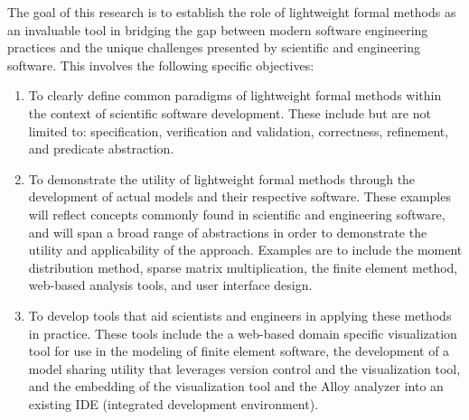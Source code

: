 \documentclass[../../proposal.tex]{subfiles}
\begin{document}
The goal of this research is to establish the role of lightweight formal methods as an invaluable tool in bridging the gap between modern software engineering practices and the unique challenges presented by scientific and engineering software.  This involves the following specific objectives:

\begin{enumerate}

    \item To clearly define common paradigms of lightweight formal methods within the context of scientific software development.  These include but are not limited to: specification, verification and validation, correctness, refinement, and predicate abstraction.
    
    \item To demonstrate the utility of lightweight formal methods through the development of actual models and their respective software.  These examples will reflect concepts commonly found in scientific and engineering software, and will span a broad range of abstractions in order to demonstrate the utility and applicability of the approach.  Examples are to include the moment distribution method, sparse matrix multiplication, the finite element method, web-based analysis tools, and user interface design.

    \item To develop tools that aid scientists and engineers in applying these methods in practice.  These tools include the a web-based domain specific visualization tool for use in the modeling of finite element software, the development of a model sharing utility that leverages version control and the visualization tool, and the embedding of the visualization tool and the Alloy analyzer into an existing IDE (integrated development environment).

\end{enumerate}
\end{document}
